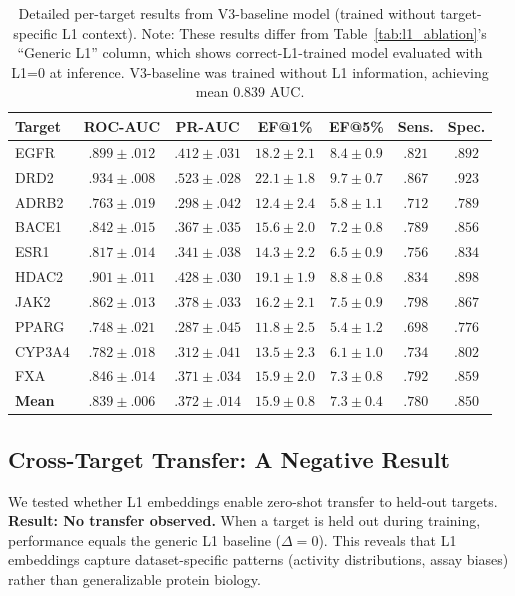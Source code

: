 \documentclass[sigconf,anonymous]{acmart}
\begin{document}
\begin{table}[t]
\caption{Detailed per-target results from V3-baseline model (trained without target-specific L1 context). Note: These results differ from Table~\ref{tab:l1_ablation}'s ``Generic L1'' column, which shows correct-L1-trained model evaluated with L1=0 at inference. V3-baseline was trained without L1 information, achieving mean 0.839 AUC.}
\label{tab:detailed_results}
\centering
\begin{tabular}{@{}lcccccc@{}}
\toprule
Target & ROC-AUC & PR-AUC & EF@1\% & EF@5\% & Sens. & Spec. \\
\midrule
EGFR & $.899 \pm .012$ & $.412 \pm .031$ & $18.2 \pm 2.1$ & $8.4 \pm 0.9$ & $.821$ & $.892$ \\
DRD2 & $.934 \pm .008$ & $.523 \pm .028$ & $22.1 \pm 1.8$ & $9.7 \pm 0.7$ & $.867$ & $.923$ \\
ADRB2 & $.763 \pm .019$ & $.298 \pm .042$ & $12.4 \pm 2.4$ & $5.8 \pm 1.1$ & $.712$ & $.789$ \\
BACE1 & $.842 \pm .015$ & $.367 \pm .035$ & $15.6 \pm 2.0$ & $7.2 \pm 0.8$ & $.789$ & $.856$ \\
ESR1 & $.817 \pm .014$ & $.341 \pm .038$ & $14.3 \pm 2.2$ & $6.5 \pm 0.9$ & $.756$ & $.834$ \\
HDAC2 & $.901 \pm .011$ & $.428 \pm .030$ & $19.1 \pm 1.9$ & $8.8 \pm 0.8$ & $.834$ & $.898$ \\
JAK2 & $.862 \pm .013$ & $.378 \pm .033$ & $16.2 \pm 2.1$ & $7.5 \pm 0.9$ & $.798$ & $.867$ \\
PPARG & $.748 \pm .021$ & $.287 \pm .045$ & $11.8 \pm 2.5$ & $5.4 \pm 1.2$ & $.698$ & $.776$ \\
CYP3A4 & $.782 \pm .018$ & $.312 \pm .041$ & $13.5 \pm 2.3$ & $6.1 \pm 1.0$ & $.734$ & $.802$ \\
FXA & $.846 \pm .014$ & $.371 \pm .034$ & $15.9 \pm 2.0$ & $7.3 \pm 0.8$ & $.792$ & $.859$ \\
\midrule
\textbf{Mean} & $.839 \pm .006$ & $.372 \pm .014$ & $15.9 \pm 0.8$ & $7.3 \pm 0.4$ & $.780$ & $.850$ \\
\bottomrule
\end{tabular}
\end{table}

\subsection{Cross-Target Transfer: A Negative Result}

We tested whether L1 embeddings enable zero-shot transfer to held-out targets. \textbf{Result: No transfer observed.} When a target is held out during training, performance equals the generic L1 baseline ($\Delta = 0$). This reveals that L1 embeddings capture dataset-specific patterns (activity distributions, assay biases) rather than generalizable protein biology.
\end{document}
